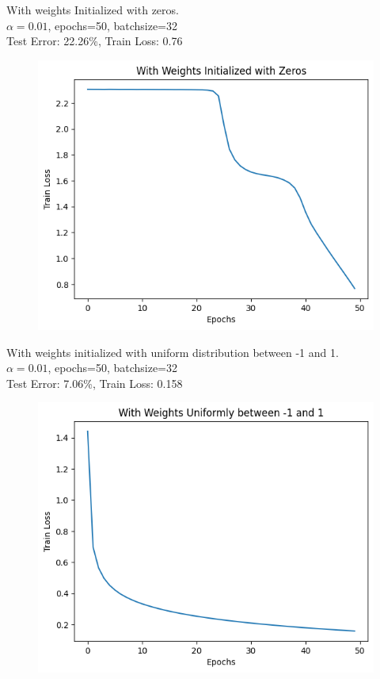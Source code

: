 \documentclass[a4paper]{article}
\theoremstyle{definition}
\newenvironment{soln}{
    \leavevmode\color{blue}\ignorespaces
}{}
\begin{document}
\begin{enumerate}
    \begin{soln}
        With weights Initialized with zeros.\\
        $\alpha=0.01$, epochs=50, batchsize=32\\
        Test Error: 22.26\%, Train Loss: 0.76
        \begin{figure}[H]
            \centering
            \includegraphics[scale=0.5]{Images/zero_init.png}
        \end{figure}

        With weights initialized with uniform distribution between -1 and 1.\\
        $\alpha=0.01$, epochs=50, batchsize=32\\
        Test Error: 7.06\%, Train Loss: 0.158
        \begin{figure}[H]
            \centering
            \includegraphics[scale=0.5]{Images/uniform_init.png}
        \end{figure}
    \end{soln}
\end{enumerate}
\end{document}
